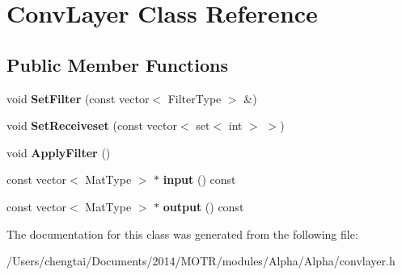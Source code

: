 \hypertarget{class_conv_layer}{\section{Conv\+Layer Class Reference}
\label{class_conv_layer}
}
\subsection*{Public Member Functions}
\begin{DoxyCompactItemize}
\item 
\hypertarget{class_conv_layer_a16a423c0e8ce590ab4757819159b015c}{void {\bfseries Set\+Filter} (const vector$<$ Filter\+Type $>$ \&)}\label{class_conv_layer_a16a423c0e8ce590ab4757819159b015c}

\item 
\hypertarget{class_conv_layer_aa2c01fc18b295fc3ddf2d48497653206}{void {\bfseries Set\+Receiveset} (const vector$<$ set$<$ int $>$ $>$)}\label{class_conv_layer_aa2c01fc18b295fc3ddf2d48497653206}

\item 
\hypertarget{class_conv_layer_a70111098046a07416fcbdffdbe8f0cfd}{void {\bfseries Apply\+Filter} ()}\label{class_conv_layer_a70111098046a07416fcbdffdbe8f0cfd}

\item 
\hypertarget{class_conv_layer_aa7d700a3f6622d2df0d3f0a33519e8ec}{const vector$<$ Mat\+Type $>$ $\ast$ {\bfseries input} () const }\label{class_conv_layer_aa7d700a3f6622d2df0d3f0a33519e8ec}

\item 
\hypertarget{class_conv_layer_ae89c7d8838a35cf1d1b1d47a4deddd48}{const vector$<$ Mat\+Type $>$ $\ast$ {\bfseries output} () const }\label{class_conv_layer_ae89c7d8838a35cf1d1b1d47a4deddd48}

\end{DoxyCompactItemize}


The documentation for this class was generated from the following file\+:\begin{DoxyCompactItemize}
\item 
/\+Users/chengtai/\+Documents/2014/\+M\+O\+T\+R/modules/\+Alpha/\+Alpha/convlayer.\+h\end{DoxyCompactItemize}
